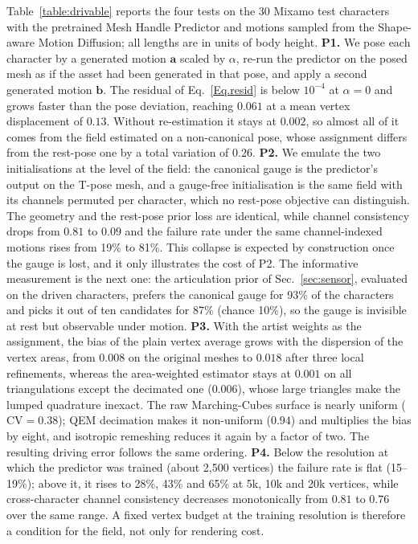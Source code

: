 \documentclass[lettersize,journal]{IEEEtran}
\newenvironment{revblock}{\par\color{red}}{\par}
\begin{document}
\begin{revblock}
Table~\ref{table:drivable} reports the four tests on the 30 Mixamo test characters with the
pretrained Mesh Handle Predictor and motions sampled from the Shape-aware Motion Diffusion; all
lengths are in units of body height. \textbf{P1.} We pose each character by a generated motion
$\bm{a}$ scaled by $\alpha$, re-run the predictor on the posed mesh as if the asset had been
generated in that pose, and apply a second generated motion $\bm{b}$. The residual of
Eq.~\ref{Eq.resid} is below $10^{-4}$ at $\alpha=0$ and grows faster than the pose deviation,
reaching $0.061$ at a mean vertex displacement of $0.13$. Without re-estimation it stays at
$0.002$, so almost all of it comes from the field estimated on a non-canonical pose, whose
assignment differs from the rest-pose one by a total variation of $0.26$. \textbf{P2.} We emulate
the two initialisations at the level of the field: the canonical gauge is the predictor's
output on the T-pose mesh, and a gauge-free initialisation is the same field with its channels
permuted per character, which no rest-pose objective can distinguish. The geometry and the
rest-pose prior loss are identical, while channel consistency drops from $0.81$ to $0.09$ and the
failure rate under the same channel-indexed motions rises from 19\% to 81\%. This collapse is
expected by construction once the gauge is lost, and it only illustrates the cost of P2. The
informative measurement is the next one: the articulation prior of Sec.~\ref{sec:sensor},
evaluated on the driven characters, prefers the canonical gauge for 93\% of the characters and
picks it out of ten candidates for 87\% (chance 10\%), so the gauge is invisible at rest but
observable under motion. \textbf{P3.} With the artist weights as
the assignment, the bias of the plain vertex average grows with the dispersion of the vertex
areas, from $0.008$ on the original meshes to $0.018$ after three local refinements, whereas the
area-weighted estimator stays at $0.001$ on all triangulations except the decimated one ($0.006$),
whose large triangles make the lumped quadrature inexact. The raw Marching-Cubes surface is
nearly uniform ($\mathrm{CV}=0.38$); QEM decimation makes it non-uniform ($0.94$) and multiplies
the bias by eight, and isotropic remeshing reduces it again by a factor of two. The resulting
driving error follows the same ordering. \textbf{P4.} Below the resolution at which the predictor was trained
(about 2,500 vertices) the failure rate is flat (15--19\%); above it, it rises to 28\%, 43\% and
65\% at 5k, 10k and 20k vertices, while cross-character channel consistency decreases
monotonically from $0.81$ to $0.76$ over the same range. A fixed vertex budget at the training
resolution is therefore a condition for the field, not only for rendering cost.
\end{revblock}
\end{document}

